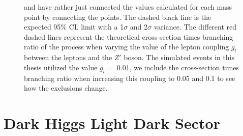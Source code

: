 \documentclass[12pt, a4paper]{book}
\begin{document}
\begin{figure}[!ht]
{   and have rather just connected the values calculated for each mass point by connecting the points. The dashed black line is the expected 95\% CL limit with a 1$\sigma$ and 2$\sigma$ variance. 
   The different red dashed lines represent the theoretical cross-section times branching ratio of the process when varying the value of the lepton coupling $g_l$ between the leptons and the $Z'$ boson. The simulated events in this thesis utilized the value $g_l=$ 0.01, we include the cross-section times branching ratio when increasing this coupling to 0.05 and 0.1 to see how the exclusions change.  }
\end{figure}


\clearpage
\section{Dark Higgs Light Dark Sector}
\end{document}
